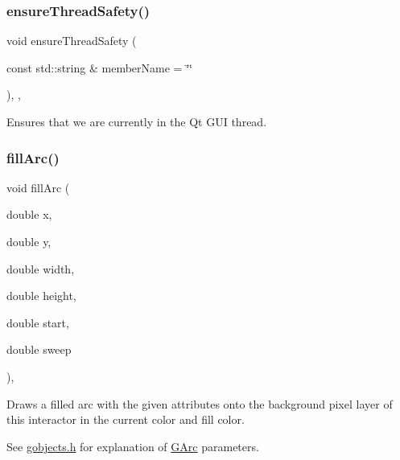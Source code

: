\mbox{\label{classGObservable_a284f31528c0520f8e545c03ac9eeac74}} 
\subsubsection{\texorpdfstring{ensure\+Thread\+Safety()}{ensureThreadSafety()}}
{\footnotesize\ttfamily void ensure\+Thread\+Safety (\begin{DoxyParamCaption}\item[{const std\+::string \&}]{member\+Name = {\ttfamily \char`\"{}\char`\"{}} }\end{DoxyParamCaption})\hspace{0.3cm}{\ttfamily [protected]}, {\ttfamily [virtual]}, {\ttfamily [inherited]}}



Ensures that we are currently in the Qt G\+UI thread. 

\mbox{\label{classGDrawingSurface_a228075ad18bd97b57f9956568c4773f3}} 
\subsubsection{\texorpdfstring{fill\+Arc()}{fillArc()}}
{\footnotesize\ttfamily void fill\+Arc (\begin{DoxyParamCaption}\item[{double}]{x,  }\item[{double}]{y,  }\item[{double}]{width,  }\item[{double}]{height,  }\item[{double}]{start,  }\item[{double}]{sweep }\end{DoxyParamCaption})\hspace{0.3cm}{\ttfamily [virtual]}, {\ttfamily [inherited]}}



Draws a filled arc with the given attributes onto the background pixel layer of this interactor in the current color and fill color. 

See \mbox{\hyperlink{gobjects_8h_source}{gobjects.\+h}} for explanation of \mbox{\hyperlink{classGArc}{G\+Arc}} parameters. \mbox{\label{classGDrawingSurface_a1ea6e48d59fb588797dba4deab1397e0}} 
